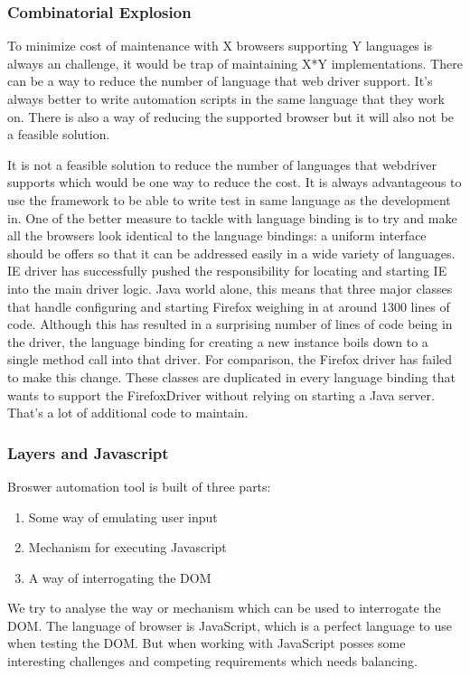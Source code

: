 \documentclass[article,type=msc,colorback,accentcolor=tud9c,twoside,11pt]{tudthesis}
\begin{document}
\subsubsection{Combinatorial Explosion}
To minimize cost of maintenance with X browsers supporting Y languages is always an challenge, it would be trap of maintaining X*Y implementations. There can be a way to reduce the number of language that web driver support. It's always better to write automation scripts in the same language that they work on. There is also a way of reducing the supported browser but it will also not be a feasible solution.

It is not a feasible solution to reduce the number of languages that webdriver supports which would be one way to reduce the cost. It is always advantageous to use the framework to be able to write test in same language as the development in. One of the better measure to tackle with language binding is to try and make all the browsers look identical to the language bindings: a uniform interface should be offers so that it can be addressed easily in a wide variety of languages. IE driver has successfully pushed the responsibility for locating and starting IE into the main driver logic. Java world alone, this means that three major classes that handle configuring and starting Firefox weighing in at around 1300 lines of code. Although this has resulted in a surprising number of lines of code being in the driver, the language binding for creating a new instance boils down to a single method call into that driver. For comparison, the Firefox driver has failed to make this change. These classes are duplicated in every language binding that wants to support the FirefoxDriver without relying on starting a Java server. That's a lot of additional code to maintain.

\subsubsection{Layers and Javascript}
Broswer automation tool is built of three parts:
\begin{enumerate}
	\item Some way of emulating user input
	\item Mechanism for executing Javascript
	\item A way of interrogating the DOM
\end{enumerate}
We try to analyse the way or mechanism which can be used to interrogate the DOM. The language of browser is JavaScript, which is a perfect language to use when testing the DOM. But when working with JavaScript posses some interesting challenges and competing requirements which needs balancing.
\end{document}
